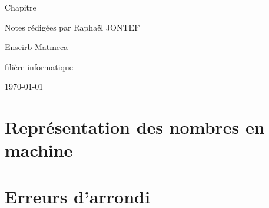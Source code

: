 \documentclass[12pt]{article}
\begin{document}



\hypersetup{pageanchor=false}
\setlength{\headheight}{15pt}
\begin{titlepage}
    \centering
    \vspace*{3cm}
    {\huge Chapitre \numeroChapitre\par}
    {\Huge \bfseries\texteNomChapitre \par} %
    \vspace{2cm}
    {\Large Notes rédigées par Raphaël JONTEF\par}
    \vspace{0.5cm}
    {\normalsize \texteNomProf \par}
    \vspace{4cm}
    {\small Enseirb-Matmeca\par}
    {\small filière informatique\par}
    \vfill
    {\large \today\par}
\end{titlepage}
\hypersetup{pageanchor=true} %

\tableofcontents
\newpage


\newcommand{\dx}{\delta x}
\newcommand{\dy}{\delta y}


\section{Représentation des nombres en machine}

\section{Erreurs d'arrondi}


% 
\end{document}
